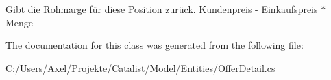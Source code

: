 Gibt die Rohmarge für diese Position zurück. Kundenpreis -\/ Einkaufspreis $\ast$ Menge 



The documentation for this class was generated from the following file\+:\begin{DoxyCompactItemize}
\item 
C\+:/\+Users/\+Axel/\+Projekte/\+Catalist/\+Model/\+Entities/Offer\+Detail.\+cs\end{DoxyCompactItemize}
